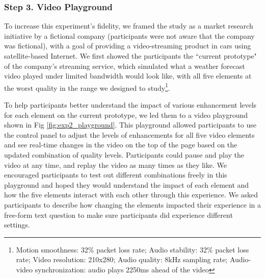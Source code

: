 \subsubsection{Step 3. Video Playground}
To increase this experiment's fidelity, we framed the study as a market research initiative by a fictional company (participants were not aware that the company was fictional), with a goal of providing a video-streaming product in cars using satellite-based Internet. We first showed the participants the ``current prototype" of the company's streaming service, which simulated what a weather forecast video played under limited bandwidth would look like, with all five elements at the worst quality in the range we designed to study\footnote{Motion smoothness: 32\% packet loss rate; Audio stability: 32\% packet loss rate; Video resolution: 210x280; Audio quality: 8kHz sampling rate; Audio-video synchronization: audio plays 2250ms ahead of the video}. 

To help participants better understand the impact of various enhancement levels for each element on the current prototype, we led them to a video playground shown in Fig \ref{fig:exp2_playground}. This playground allowed participants to use the control panel to adjust the levels of enhancements for all five video elements and see real-time changes in the video on the top of the page based on the updated combination of quality levels. Participants could pause and play the video at any time, and replay the video as many times as they like. We encouraged participants to test out different combinations freely in this playground and hoped they would understand the impact of each element and how the five elements interact with each other through this experience. We asked participants to describe how changing the elements impacted their experience in a free-form text question to make sure participants did experience different settings.


